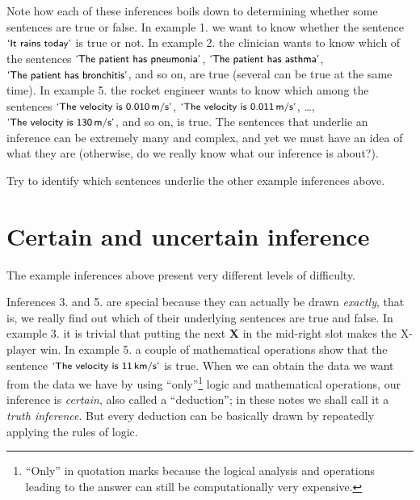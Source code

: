 \documentclass[
  a4paper,
  DIV=11,
  numbers=noendperiod,
  oneside]{scrreprt}
\begin{document}
Note how each of these inferences boils down to determining whether some
sentences are true or false. In example 1. we want to know whether the
sentence \(\textsf{\small`It rains today'}\) is true or not. In example
2. the clinician wants to know which of the sentences
\(\textsf{\small`The patient has pneumonia'}\),
\(\textsf{\small`The patient has asthma'}\),
\(\textsf{\small`The patient has bronchitis'}\), and so on, are true
(several can be true at the same time). In example 5. the rocket
engineer wants to know which among the sentences
\(\textsf{\small`The velocity is 0.010\,m/s'}\),
\(\textsf{\small`The velocity is 0.011\,m/s'}\), \ldots,
\(\textsf{\small`The velocity is 130\,m/s'}\), and so on, is true. The
sentences that underlie an inference can be extremely many and complex,
and yet we must have an idea of what they are (otherwise, do we really
know what our inference is about?).

\begin{tcolorbox}[enhanced jigsaw, titlerule=0mm, toprule=.15mm, toptitle=1mm, bottomrule=.15mm, leftrule=.75mm, title={Exercise}, arc=.35mm, breakable, left=2mm, coltitle=black, colframe=quarto-callout-caution-color-frame, colbacktitle=quarto-callout-caution-color!10!white, bottomtitle=1mm, rightrule=.15mm, opacitybacktitle=0.6, opacityback=0, colback=white]

Try to identify which sentences underlie the other example inferences
above.

\end{tcolorbox}

\hypertarget{certain-and-uncertain-inference}{%
\section{Certain and uncertain
inference}\label{certain-and-uncertain-inference}}

The example inferences above present very different levels of
difficulty.

Inferences 3. and 5. are special because they can actually be drawn
\emph{exactly}, that is, we really find out which of their underlying
sentences are true and false. In example 3. it is trivial that putting
the next {\textbf{X}} in the mid-right slot makes the X-player win. In
example 5. a couple of mathematical operations show that the sentence
\(\textsf{\small`The velocity is 11\,km/s'}\) is true. When we can
obtain the data we want from the data we have by using
``only''\footnote{``Only'' in quotation marks because the logical
  analysis and operations leading to the answer can still be
  computationally very expensive.} logic and mathematical operations,
our inference is \emph{certain}, also called a ``deduction''; in these
notes we shall call it a \emph{truth inference}. But every deduction can
be basically drawn by repeatedly applying the rules of logic.
\end{document}
